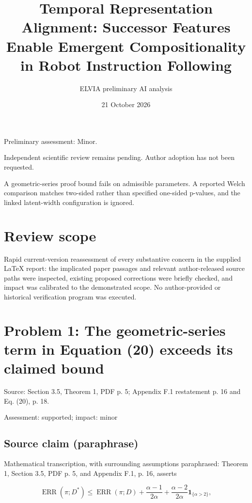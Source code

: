 \documentclass[11pt]{article}
\begin{document}
\title{Temporal Representation Alignment: Successor Features Enable Emergent Compositionality in Robot Instruction Following}

\author{ELVIA preliminary AI analysis}\date{21 October 2026}\maketitle

Preliminary assessment: Minor.\par

Independent scientific review remains pending. Author adoption has not been requested.

A geometric-series proof bound fails on admissible parameters. A reported Welch comparison matches two-sided rather than specified one-sided p-values, and the linked latent-width configuration is ignored.

\section*{Review scope}

Rapid current-version reassessment of every substantive concern in the supplied LaTeX report: the implicated paper passages and relevant author-released source paths were inspected, existing proposed corrections were briefly checked, and impact was calibrated to the demonstrated scope. No author-provided or historical verification program was executed.

\section*{Problem 1: The geometric-series term in Equation (20) exceeds its claimed bound}

Source: Section 3.5, Theorem 1, PDF p. 5; Appendix F.1 restatement p. 16 and Eq. (20), p. 18.

Assessment: supported; impact: minor

\subsection*{Source claim (paraphrase)}

Mathematical transcription, with surrounding assumptions paraphrased: Theorem 1, Section 3.5, PDF p. 5, and Appendix F.1, p. 16, asserts

\[\operatorname{ERR}(\pi;D^\ast) \leq \operatorname{ERR}(\pi;D) +\frac{\alpha-1}{2\alpha} +\frac{\alpha-2}{2\alpha}\mathbf 1_{\{\alpha>2\}},\]
\end{document}
